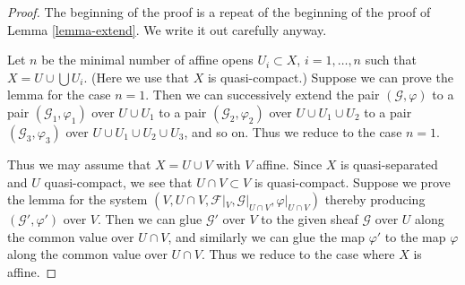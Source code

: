 \begin{proof}
The beginning of the proof is a repeat of the beginning of the
proof of Lemma \ref{lemma-extend}. We write it out carefully anyway.

\medskip\noindent
Let $n$ be the minimal number of affine opens $U_i \subset X$,
$i = 1, \ldots , n$ such that $X = U \cup \bigcup U_i$.
(Here we use that $X$ is quasi-compact.) Suppose
we can prove the lemma for the case $n = 1$. Then we can successively
extend the pair $(\mathcal{G}, \varphi)$
to a pair $(\mathcal{G}_1, \varphi_1)$ over $U \cup U_1$
to a pair $(\mathcal{G}_2, \varphi_2)$ over $U \cup U_1 \cup U_2$
to a pair $(\mathcal{G}_3, \varphi_3)$ over $U \cup U_1 \cup U_2 \cup U_3$,
and so on.
Thus we reduce to the case $n = 1$.

\medskip\noindent
Thus we may assume that $X = U \cup V$ with $V$ affine.
Since $X$ is quasi-separated and $U$ quasi-compact,
we see that $U \cap V \subset V$ is quasi-compact.
Suppose we prove the lemma for the system
$(V, U \cap V, \mathcal{F}|_V, \mathcal{G}|_{U \cap V}, \varphi|_{U \cap V})$
thereby producing $(\mathcal{G}', \varphi')$ over $V$.
Then we can glue $\mathcal{G}'$ over $V$ to the given sheaf $\mathcal{G}$
over $U$ along the common value over $U \cap V$, and similarly we can glue
the map $\varphi'$ to the map $\varphi$ along the common value over
$U \cap V$. Thus we reduce to the case where $X$ is affine.


\end{proof}
